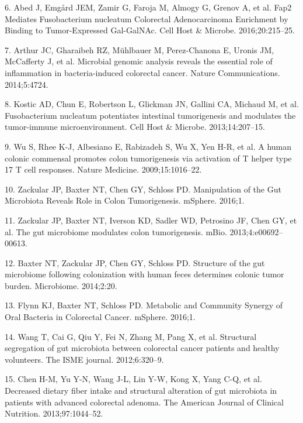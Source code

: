 \documentclass[12pt,]{article}
\begin{document}
\hypertarget{ref-abed_fap2_2016}{}
6. Abed J, Emgård JEM, Zamir G, Faroja M, Almogy G, Grenov A, et al.
Fap2 Mediates Fusobacterium nucleatum Colorectal Adenocarcinoma
Enrichment by Binding to Tumor-Expressed Gal-GalNAc. Cell Host \&
Microbe. 2016;20:215--25.

\hypertarget{ref-arthur_microbial_2014}{}
7. Arthur JC, Gharaibeh RZ, Mühlbauer M, Perez-Chanona E, Uronis JM,
McCafferty J, et al. Microbial genomic analysis reveals the essential
role of inflammation in bacteria-induced colorectal cancer. Nature
Communications. 2014;5:4724.

\hypertarget{ref-kostic_fusobacterium_2013}{}
8. Kostic AD, Chun E, Robertson L, Glickman JN, Gallini CA, Michaud M,
et al. Fusobacterium nucleatum potentiates intestinal tumorigenesis and
modulates the tumor-immune microenvironment. Cell Host \& Microbe.
2013;14:207--15.

\hypertarget{ref-wu_human_2009}{}
9. Wu S, Rhee K-J, Albesiano E, Rabizadeh S, Wu X, Yen H-R, et al. A
human colonic commensal promotes colon tumorigenesis via activation of T
helper type 17 T cell responses. Nature Medicine. 2009;15:1016--22.

\hypertarget{ref-zackular_manipulation_2016}{}
10. Zackular JP, Baxter NT, Chen GY, Schloss PD. Manipulation of the Gut
Microbiota Reveals Role in Colon Tumorigenesis. mSphere. 2016;1.

\hypertarget{ref-zackular_gut_2013}{}
11. Zackular JP, Baxter NT, Iverson KD, Sadler WD, Petrosino JF, Chen
GY, et al. The gut microbiome modulates colon tumorigenesis. mBio.
2013;4:e00692--00613.

\hypertarget{ref-baxter_structure_2014}{}
12. Baxter NT, Zackular JP, Chen GY, Schloss PD. Structure of the gut
microbiome following colonization with human feces determines colonic
tumor burden. Microbiome. 2014;2:20.

\hypertarget{ref-flynn_metabolic_2016}{}
13. Flynn KJ, Baxter NT, Schloss PD. Metabolic and Community Synergy of
Oral Bacteria in Colorectal Cancer. mSphere. 2016;1.

\hypertarget{ref-wang_structural_2012}{}
14. Wang T, Cai G, Qiu Y, Fei N, Zhang M, Pang X, et al. Structural
segregation of gut microbiota between colorectal cancer patients and
healthy volunteers. The ISME journal. 2012;6:320--9.

\hypertarget{ref-chen_decreased_2013}{}
15. Chen H-M, Yu Y-N, Wang J-L, Lin Y-W, Kong X, Yang C-Q, et al.
Decreased dietary fiber intake and structural alteration of gut
microbiota in patients with advanced colorectal adenoma. The American
Journal of Clinical Nutrition. 2013;97:1044--52.
\end{document}
